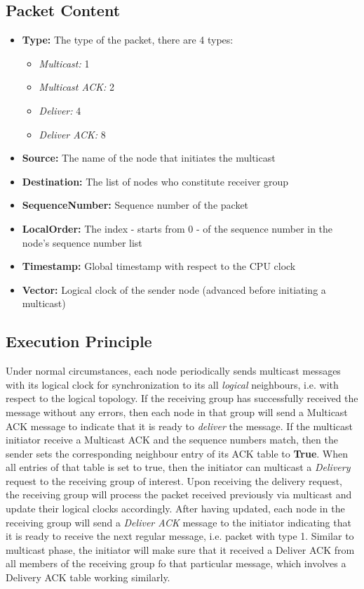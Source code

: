 \documentclass[a4paper, 12pt]{article}
\begin{document}
\subsection{Packet Content}
\begin{itemize}
    \item \textbf{Type:} The type of the packet, there are 4 types:
    \begin{itemize}
        \item \textit{Multicast:} 1
        \item \textit{Multicast ACK:} 2
        \item \textit{Deliver:} 4
        \item \textit{Deliver ACK:} 8
    \end{itemize}
    \item \textbf{Source:} The name of the node that initiates the multicast
    \item \textbf{Destination:} The list of nodes who constitute receiver group
    \item \textbf{SequenceNumber:} Sequence number of the packet
    \item \textbf{LocalOrder:} The index - starts from 0 - of the sequence number in the node's sequence number list
    \item \textbf{Timestamp:} Global timestamp with respect to the CPU clock
    \item \textbf{Vector:} Logical clock of the sender node (advanced before initiating a multicast)
\end{itemize}


\subsection{Execution Principle}
Under normal circumstances, each node periodically sends multicast messages with its logical clock for synchronization to its all \textit{logical} neighbours, i.e. with respect to the logical topology. If the receiving group has successfully received the message without any errors, then each node in that group will send a Multicast ACK message to indicate that it is ready to \textit{deliver} the message. If the multicast initiator receive a Multicast ACK and the sequence numbers match, then the sender sets the corresponding neighbour entry of its ACK table to \textbf{True}. When all entries of that table is set to true, then the initiator can multicast a \textit{Delivery} request to the receiving group of interest. Upon receiving the delivery request, the receiving group will process the packet received previously via multicast and update their logical clocks accordingly. After having updated, each node in the receiving group will send a \textit{Deliver ACK} message to the initiator indicating that it is ready to receive the next regular message, i.e. packet with type 1. Similar to multicast phase, the initiator will make sure that it received a Deliver ACK from all members of the receiving group fo that particular message, which involves a Delivery ACK table working similarly.
\end{document}
